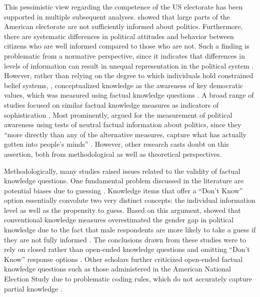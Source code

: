 \documentclass[12pt]{article}
\begin{document}
This pessimistic view regarding the competence of the US electorate has been supported in multiple subsequent analyses. \citet{carpini1996americans} showed that large parts of the American electorate are not sufficiently informed about politics. Furthermore, there are systematic differences in political attitudes and behavior between citizens who are well informed compared to those who are not. Such a finding is problematic from a normative perspective, since it indicates that differences in levels of information can result in unequal representation in the political system \citep[see also][]{althaus1998information,kuklinski2000misinformation,gilens2001political}. However, rather than relying on the degree to which individuals hold constrained belief systems, \citet{carpini1996americans}, conceptualized knowledge as the awareness of key democratic values, which was measured using factual knowledge questions \citep[see also][]{carpini1993measuring}. A broad range of studies focused on similar factual knowledge measures as indicators of sophistication \citep[e.g.][]{zaller1991information,jacoby1995structure,gomez2001political}. Most prominently, \citet{zaller1992nature} argued for the measurement of political awareness using tests of neutral factual information about politics, since they ``more directly than any of the alternative measures, capture what has actually gotten into people’s minds'' \citep[21]{zaller1992nature}. However, other research casts doubt on this assertion, both from methodological as well as theoretical perspectives.

Methodologically, many studies raised issues related to the validity of factual knowledge questions. One fundamental problem discussed in the literature are potential biases due to guessing \citep{mondak2000reconsidering,mondak2001developing,mondak2001asked,miller2008experimenting}. Knowledge items that offer a ``Don't Know'' option essentially convolute two very distinct concepts: the individual information level as well as the propensity to guess. Based on this argument, \citet{mondak2004knowledge} showed that conventional knowledge measures overestimated the gender gap in political knowledge due to the fact that male respondents are more likely to take a guess if they are not fully informed \citep[see also][for a more recent discussion of differential item functioning as an explanation for knowledge gaps]{pietryka2013analysis}. The conclusions drawn from these studies were to rely on closed rather than open-ended knowledge questions and omitting ``Don't Know'' response options \citep[but see][]{sturgis2008experiment,luskin2011don}. Other scholars further criticized open-ended factual knowledge questions such as those administered in the American National Election Study due to problematic coding rules, which do not accurately capture partial knowledge \citep{krosnick2008problems,gibson2009knowing,debell2013harder}.
\end{document}
